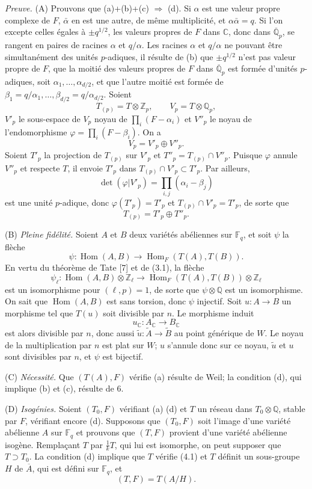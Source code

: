 \documentclass[10pt]{article}
\newcommand{\C}{\mathbb C}
\newcommand{\Fq}{\mathbb F_q}
\newcommand{\Q}{\mathbb Q}
\newcommand{\Z}{\mathbb Z}
\newcommand{\Ac}{A_{\C}}
\newcommand{\Hom}{\operatorname{Hom}}
\begin{document}
\emph{Preuve.} (A) Prouvons que (a)+(b)+(c) $\Rightarrow$ (d). Si $\alpha$ est une valeur propre complexe de $F$, $\bar\alpha$ en est une autre, de même multiplicité, et $\alpha\bar\alpha=q$. Si l'on excepte celles égales à $\pm q^{1/2}$, les valeurs propres de $F$ dans $\C$, donc dans $\overline{\Q}_p$, se rangent en paires de racines $\alpha$ et $q/\alpha$. Les racines $\alpha$ et $q/\alpha$ ne pouvant être simultanément des unités $p$-adiques, il résulte de (b) que $\pm q^{1/2}$ n'est pas valeur propre de $F$, que la moitié des valeurs propres de $F$ dans $\overline{\Q}_p$ est formée d'unités $p$-adiques, soit $\alpha_1,\ldots,\alpha_{d/2}$, et que l'autre moitié est formée de $\beta_1=q/\alpha_1,\ldots,\beta_{d/2}=q/\alpha_{d/2}$. Soient
\[
T_{(p)}=T\otimes\Z_p,\qquad V_p=T\otimes\Q_p,
\]
$V'_p$ le sous-espace de $V_p$ noyau de $\prod_i(F-\alpha_i)$ et $V''_p$ le noyau de l'endomorphisme $\varphi=\prod_i(F-\beta_i)$. On a
\[
V_p=V'_p\oplus V''_p.
\]
Soient $T'_p$ la projection de $T_{(p)}$ sur $V'_p$ et $T''_p=T_{(p)}\cap V''_p$. Puisque $\varphi$ annule $V''_p$ et respecte $T$, il envoie $T'_p$ dans $T_{(p)}\cap V'_p\subset T'_p$. Par ailleurs,
\[
\det(\varphi|V'_p)=\prod_{i,j}(\alpha_i-\beta_j)
\]
est une unité $p$-adique, donc $\varphi(T'_p)=T'_p$ et $T_{(p)}\cap V'_p=T'_p$, de sorte que
\[
T_{(p)}=T'_p\oplus T''_p.
\]

(B) \emph{Pleine fidélité.} Soient $A$ et $B$ deux variétés abéliennes sur $\Fq$, et soit $\psi$ la flèche
\[
\psi:\Hom(A,B)\longrightarrow\Hom_F(T(A),T(B)).
\]
En vertu du théorème de Tate [7] et de (3.1), la flèche
\[
\psi_\ell:\Hom(A,B)\otimes\Z_\ell
\longrightarrow
\Hom_F(T(A),T(B))\otimes\Z_\ell
\]
est un isomorphisme pour $(\ell,p)=1$, de sorte que $\psi\otimes\Q$ est un isomorphisme. On sait que $\Hom(A,B)$ est sans torsion, donc $\psi$ injectif. Soit $u:A\to B$ un morphisme tel que $T(u)$ soit divisible par $n$. Le morphisme induit
\[
u_{\C}:\Ac\longrightarrow B_{\C}
\]
est alors divisible par $n$, donc aussi $\widetilde u:\widetilde A\to\widetilde B$ au point générique de $W$. Le noyau de la multiplication par $n$ est plat sur $W$; $u$ s'annule donc sur ce noyau, $\widetilde u$ et $u$ sont divisibles par $n$, et $\psi$ est bijectif.

(C) \emph{Nécessité.} Que $(T(A),F)$ vérifie (a) résulte de Weil; la condition (d), qui implique (b) et (c), résulte de 6.

(D) \emph{Isogénies.} Soient $(T_0,F)$ vérifiant (a) (d) et $T$ un réseau dans $T_0\otimes\Q$, stable par $F$, vérifiant encore (d). Supposons que $(T_0,F)$ soit l'image d'une variété abélienne $A$ sur $\Fq$ et prouvons que $(T,F)$ provient d'une variété abélienne isogène. Remplaçant $T$ par $\frac1kT$, qui lui est isomorphe, on peut supposer que $T\supset T_0$. La condition (d) implique que $T$ vérifie (4.1) et $T$ définit un sous-groupe $H$ de $\overline A$, qui est défini sur $\Fq$, et
\[
(T,F)=T(A/H).
\]
\end{document}
